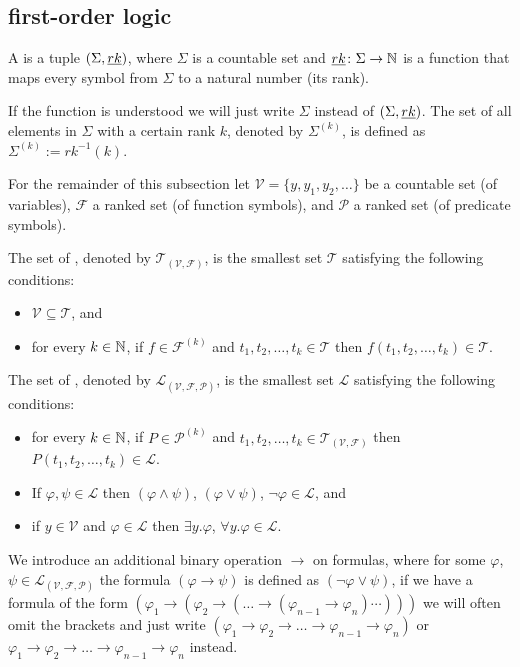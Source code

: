 \subsection{first-order logic}
\begin{definition}\label{def.2.15}
	A  is a tuple $(\Sigma,\emph{rk})$, where $\Sigma$ is a countable set and $\emph{rk}\colon\Sigma\to\mathbb{N}$ is a function that maps every symbol from $\Sigma$ to a natural number (its rank).
\end{definition}
If the function \rank{} is understood we will just write $\Sigma$ instead of $(\Sigma,\emph{rk})$. The set of all elements in $\Sigma$ with a certain rank $k$, denoted by $\Sigma^{(k)}$, is defined as $\Sigma^{(k)}:=rk^{-1}(k)$. 


For the remainder of this subsection let $\mathcal{V}=\{y,y_1,y_2,\dots\}$ be a countable set (of variables), $\mathcal{F}$ a ranked set (of function symbols), and $\mathcal{P}$ a ranked set (of predicate symbols).
\begin{definition}\label{def.2.16}
	The set of , denoted by $\mathcal{T}_{(\mathcal{V},\mathcal{F})}$, is the smallest set $\mathcal{T}$ satisfying the following conditions:
	\begin{itemize}
		\item $\mathcal{V} \subseteq \mathcal{T}$, and
		\item for every $k\in\mathbb{N}$, if $f\in\mathcal{F}^{(k)}$ and $t_1,t_2,\dots,t_k\in\mathcal{T}$ then $f(t_1,t_2,\dots,t_k)\in\mathcal{T}$.
	\end{itemize}
	The set of , denoted by $\mathcal{L}_{(\mathcal{V},\mathcal{F},\mathcal{P})}$, is the smallest set $\mathcal{L}$ satisfying the following conditions:
	\begin{itemize}
		\item for every $k\in\mathbb{N}$, if $P\in\mathcal{P}^{(k)}$ and $t_1,t_2,\dots,t_k\in\mathcal{T}_{(\mathcal{V},\mathcal{F})}$ then $P(t_1,t_2,\dots,t_k)\in\mathcal{L}$.
		\item If $\varphi,\psi\in\mathcal{L}$ then $(\varphi\wedge\psi)$, $(\varphi\vee\psi)$, $\neg \varphi\in\mathcal{L}$, and
		\item if $y\in\mathcal{V}$ and $\varphi\in\mathcal{L}$ then $\exists y.\varphi$, $\forall y.\varphi\in\mathcal{L}$.
	\end{itemize}
\end{definition}
We introduce an additional binary operation $\to$ on formulas, where for some $\varphi$, $\psi\in\mathcal{L}_{(\mathcal{V},\mathcal{F},\mathcal{P})}$ the formula $(\varphi\to\psi)$ is defined as $(\neg\varphi\vee\psi)$, if we have a formula of the form $(\varphi_1\to(\varphi_2\to(\dots \to(\varphi_{n-1}\to \varphi_n)\cdots)))$ we will often omit the brackets and just write $(\varphi_1\to \varphi_2\to\dots\to \varphi_{n-1}\to \varphi_n)$ or $\varphi_1\to \varphi_2\to\dots \to \varphi_{n-1}\to \varphi_n$ instead. 

